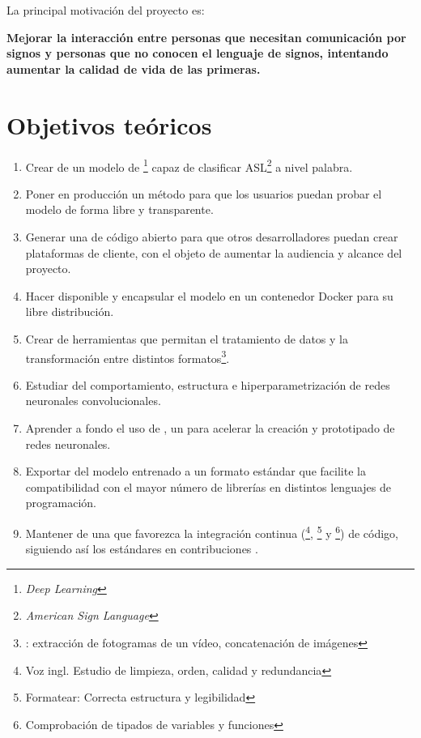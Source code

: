 
La principal motivación del proyecto es:

\textbf{
  Mejorar la interacción entre personas que necesitan comunicación por signos y personas que no conocen el lenguaje de signos, intentando aumentar la calidad de vida de las primeras.
}


\section{Objetivos teóricos}

\begin{enumerate}
  \item Crear de un modelo de \footnote{\textit{Deep Learning}} capaz de clasificar ASL\footnote{\textit{American Sign Language}} a nivel palabra.
  \item Poner en producción un método para que los usuarios puedan probar el modelo de forma libre y transparente.
  \item Generar una  de código abierto para que otros desarrolladores puedan crear plataformas de cliente, con el objeto de aumentar la audiencia y alcance del proyecto.
  \item Hacer disponible y encapsular el modelo en un contenedor Docker para su libre distribución.
  \item Crear de herramientas que permitan el tratamiento de datos y la transformación entre distintos formatos\footnote{\pe: extracción de fotogramas de un vídeo, concatenación de imágenes}.
  \item Estudiar del comportamiento, estructura e hiperparametrización de redes neuronales convolucionales.
  \item Aprender a fondo el uso de \cite{PYTORCH}, un  para acelerar la creación y prototipado de redes neuronales.
  \item Exportar del modelo entrenado a un formato estándar que facilite la compatibilidad con el mayor número de librerías en distintos lenguajes de programación.
  \item Mantener de una  que favorezca la integración continua (\footnote{Voz ingl. Estudio de limpieza, orden, calidad y redundancia}, \footnote{Formatear: Correcta estructura y legibilidad} y \footnote{Comprobación de tipados de variables y funciones}) de código, siguiendo así los estándares en contribuciones .
\end{enumerate}


